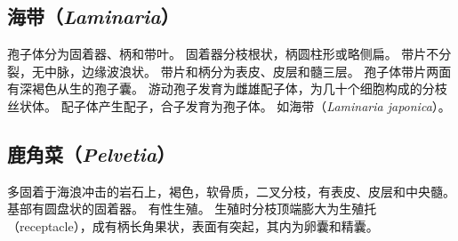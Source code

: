 \documentclass[11pt]{article}
\begin{document}
\subsection{海带（\textit{Laminaria}）}
孢子体分为固着器、柄和带叶。
固着器分枝根状，柄圆柱形或略侧扁。
带片不分裂，无中脉，边缘波浪状。
带片和柄分为表皮、皮层和髓三层。
孢子体带片两面有深褐色从生的孢子囊。
游动孢子发育为雌雄配子体，为几十个细胞构成的分枝丝状体。
配子体产生配子，合子发育为孢子体。
如海带（\textit{Laminaria japonica}）。

\subsection{鹿角菜（\textit{Pelvetia}）}
多固着于海浪冲击的岩石上，褐色，软骨质，二叉分枝，有表皮、皮层和中央髓。
基部有圆盘状的固着器。
有性生殖。
生殖时分枝顶端膨大为生殖托（receptacle），成有柄长角果状，表面有突起，其内为卵囊和精囊。
\end{document}

